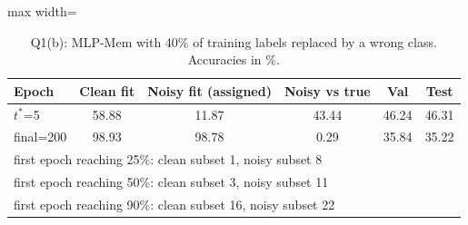 \begin{table}[!tbp]\centering\footnotesize\setlength{\tabcolsep}{3pt}
\begin{adjustbox}{max width=\columnwidth}
\begin{tabular}{lccccc}\toprule
Epoch & Clean fit & Noisy fit (assigned) & Noisy vs true & Val & Test \\\midrule
$t^*$=5 & 58.88 & 11.87 & 43.44 & 46.24 & 46.31 \\
final=200 & 98.93 & 98.78 & 0.29 & 35.84 & 35.22 \\\midrule
\multicolumn{6}{l}{first epoch reaching 25\%: clean subset 1, noisy subset 8} \\
\multicolumn{6}{l}{first epoch reaching 50\%: clean subset 3, noisy subset 11} \\
\multicolumn{6}{l}{first epoch reaching 90\%: clean subset 16, noisy subset 22} \\
\bottomrule\end{tabular}
\end{adjustbox}
\caption{Q1(b): MLP-Mem with 40\% of training labels replaced by a wrong class. Accuracies in \%.}\label{tab:q1b}\end{table}
